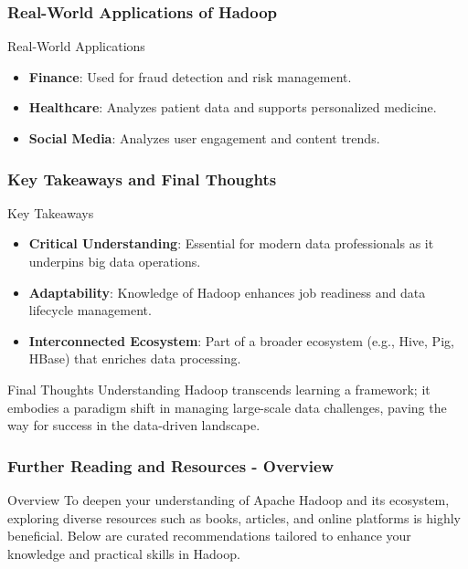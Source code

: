 \documentclass[aspectratio=169]{beamer}
\begin{document}
\begin{frame}[fragile]
    \frametitle{Real-World Applications of Hadoop}
    \begin{block}{Real-World Applications}
        \begin{itemize}
            \item \textbf{Finance}: Used for fraud detection and risk management.
            \item \textbf{Healthcare}: Analyzes patient data and supports personalized medicine.
            \item \textbf{Social Media}: Analyzes user engagement and content trends.
        \end{itemize}
    \end{block}
\end{frame}

\begin{frame}[fragile]
    \frametitle{Key Takeaways and Final Thoughts}
    \begin{block}{Key Takeaways}
        \begin{itemize}
            \item \textbf{Critical Understanding}: Essential for modern data professionals as it underpins big data operations.
            \item \textbf{Adaptability}: Knowledge of Hadoop enhances job readiness and data lifecycle management.
            \item \textbf{Interconnected Ecosystem}: Part of a broader ecosystem (e.g., Hive, Pig, HBase) that enriches data processing.
        \end{itemize}
    \end{block}
    
    \begin{block}{Final Thoughts}
        Understanding Hadoop transcends learning a framework; it embodies a paradigm shift in managing large-scale data challenges, paving the way for success in the data-driven landscape.
    \end{block}
\end{frame}

\begin{frame}[fragile]
    \frametitle{Further Reading and Resources - Overview}
    \begin{block}{Overview}
        To deepen your understanding of Apache Hadoop and its ecosystem, exploring diverse resources such as books, articles, and online platforms is highly beneficial. Below are curated recommendations tailored to enhance your knowledge and practical skills in Hadoop.
    \end{block}
\end{frame}
\end{document}
